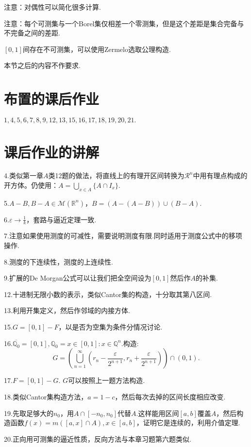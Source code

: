 \documentclass[bwprint, withoutpreface]{cumcmthesis}
\begin{document}
注意：对偶性可以简化很多计算.

注意：每个可测集与一个Borel集仅相差一个零测集，但是这个差距是集合完备与不完备之间的差距.

$[0, 1]$间存在不可测集，可以使用Zermelo选取公理构造.

本节之后的内容不作要求.

\appendix
\section{布置的课后作业}
\indent $1,4,5,6,7,8,9,12,13,15,16,17,18,19,20,21.$

\section{课后作业的讲解}
\indent 4.类似第一章$A$类12题的做法，将直线上的有理开区间转换为$\mathcal{R}^n$中用有理点构成的开方体。仍使用：$A = \bigcup_{x \in A}\{A \cap I_x\}$.

5.$A - B, B - A \in \mathcal{M}(\mathbb{R}^n)$，$B = (A - (A - B)) \cup (B - A)$.

6.$\varepsilon \to \frac{1}{k}$，套路与逼近定理一致.

7.注意如果使用测度的可减性，需要说明测度有限.同时适用于测度公式中的移项操作.

8.测度的下连续性，测度的上连续性.

9.扩展的De Morgan公式可以让我们把全空间设为$[0, 1]$然后作$A$的补集.

12.十进制无限小数的表示，类似Cantor集的构造，十分取其第八区间.

13.利用开集定义，然后作邻域的内接方体.

15.$G = [0, 1] - F$，以是否为空集为条件分情况讨论.

16.$\overline{\mathbb{Q}_0} = [0, 1], \mathbb{Q}_0 = {x \in [0, 1]: x \in \mathbb{Q}^n}$.构造:
\begin{equation*}
	G = (\bigcup_{n = 1}^{\infty}{(r_n - \frac{\varepsilon}{2^{n + 1}}, r_n + \frac{\varepsilon}{2^{n + 1}})}) \cap (0, 1).
\end{equation*}

17.$F = [0, 1] - G$. $G$可以按照上一题方法构造.

18.类似Cantor集构造方法，$a = 1 - c$，然后每次去掉的区间长度相应改变.

19.先取足够大的$n_0$，用$A \cap [-n_0, n_0]$代替$A$.这样能用区间$[a, b]$覆盖$A$，然后构造函数$f(x) = m([a, x] \cap A), x \in [a, b]$，证明它是连续的，利用介值定理.

20.正向用可测集的逼近性质，反向方法与本章习题第六题类似.
\end{document}
